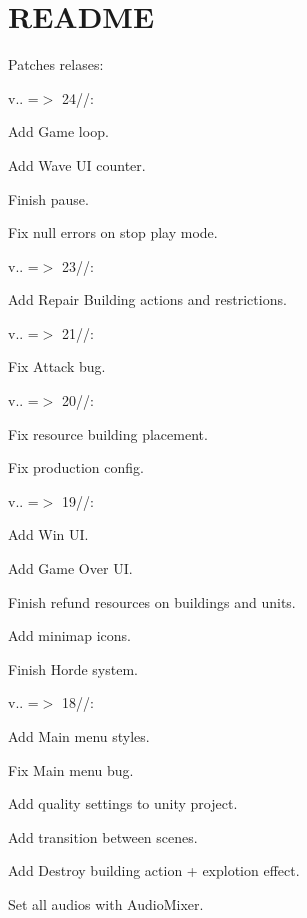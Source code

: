 \chapter{README }
\hypertarget{md__r_e_a_d_m_e}{}\label{md__r_e_a_d_m_e}
Patches relases:\+

v.. =\texorpdfstring{$>$}{>} 24//:\+
\begin{DoxyItemize}
\item Add Game loop.
\item Add Wave UI counter.
\item Finish pause.
\item Fix null errors on stop play mode.
\end{DoxyItemize}

v.. =\texorpdfstring{$>$}{>} 23//:\+
\begin{DoxyItemize}
\item Add Repair Building actions and restrictions.
\end{DoxyItemize}

v.. =\texorpdfstring{$>$}{>} 21//:\+
\begin{DoxyItemize}
\item Fix Attack bug.
\end{DoxyItemize}

v.. =\texorpdfstring{$>$}{>} 20//:\+
\begin{DoxyItemize}
\item Fix resource building placement.
\item Fix production config.
\end{DoxyItemize}

v.. =\texorpdfstring{$>$}{>} 19//:\+
\begin{DoxyItemize}
\item Add Win UI.
\item Add Game Over UI.
\item Finish refund resources on buildings and units.
\item Add minimap icons.
\item Finish Horde system.
\end{DoxyItemize}

v.. =\texorpdfstring{$>$}{>} 18//:\+
\begin{DoxyItemize}
\item Add Main menu styles.
\item Fix Main menu bug.
\item Add quality settings to unity project.
\item Add transition between scenes.
\item Add Destroy building action + explotion effect.
\item Set all audios with Audio\+Mixer.
\end{DoxyItemize}

